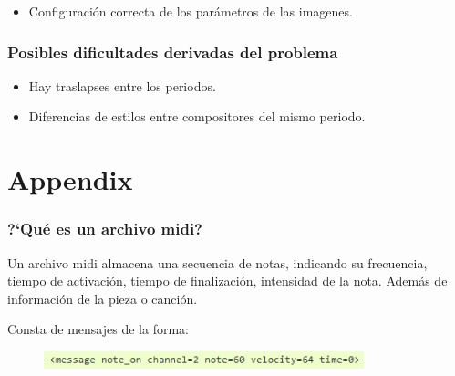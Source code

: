 \documentclass{beamer}
\theoremstyle{plain}
\newtheorem{simp}[thm]{Posibles simplificaciones}
\numberwithin{equation}{section} %
\numberwithin{figure}{section} %
\numberwithin{table}{section} %
\begin{document}
{\begin{frame}
\begin{itemize}[<+->]
\item Configuraci\'on correcta de los par\'ametros de las imagenes.

\end{itemize}

\end{frame}


\begin{frame}
\frametitle{Posibles dificultades derivadas del problema}
\justifying

\begin{itemize}[<+->]
\item Hay traslapses entre los periodos.
\medskip
\item Diferencias de estilos entre compositores del mismo periodo.
\end{itemize}
\medskip

\bigskip


\end{frame}

\appendix

\section{Appendix}


\begin{frame}[label=midi]
\frametitle{?`Qu\'e es un archivo midi?}
\justifying

Un archivo midi almacena una secuencia de notas, indicando su frecuencia, tiempo de activaci\'on, tiempo de finalizaci\'on, intensidad de la nota. Adem\'as de informaci\'on de la pieza o canci\'on.\\

\medskip

Consta de mensajes de la forma:\\

\begin{figure}[H]
\includegraphics[height=5mm]{midi-msg.png}
\end{figure}



\hyperlink{enfoque}{}
\end{frame}


}
\end{document}
